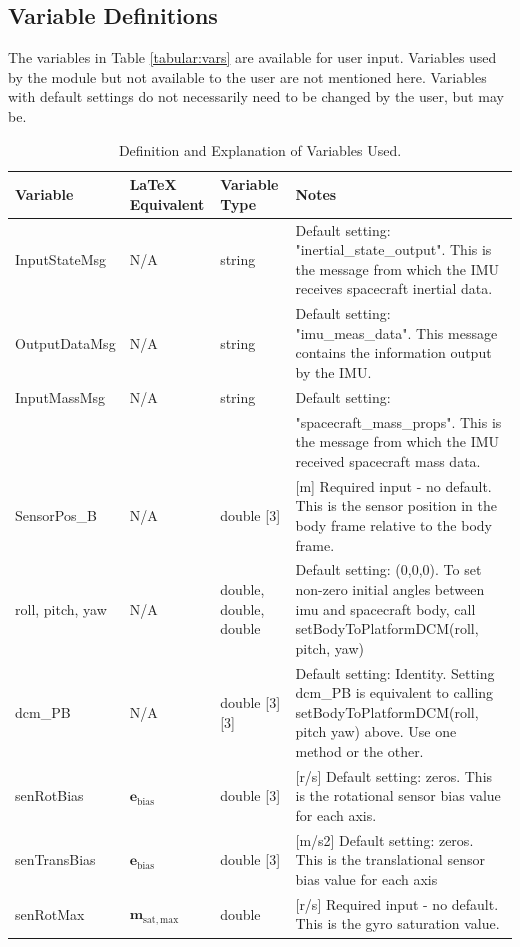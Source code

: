 \subsection{Variable Definitions}
The variables in Table \ref{tabular:vars} are available for user input. Variables used by the module but not available to the user are not mentioned here. Variables with default settings do not necessarily need to be changed by the user, but may be.
\begin{table}[H]
	\caption{Definition and Explanation of Variables Used.}
	\label{tab:errortol}
	\centering \fontsize{10}{10}\selectfont
	\begin{tabular}{ | m{3cm}| m{3cm} | m{3cm} | m{6cm} |} %
		\hline
		\textbf{Variable}   							& \textbf{LaTeX Equivalent} 	&		\textbf{Variable Type} & \textbf{Notes}			  \\ \hline
		InputStateMsg&N/A		   & string & Default setting: "inertial\_state\_output". This is the message from which the IMU receives spacecraft inertial data.\\ \hline
		OutputDataMsg & N/A & string & Default setting: "imu\_meas\_data". This message contains the information output by the IMU. \\ \hline
		InputMassMsg & N/A & string & Default setting: \\&&&"spacecraft\_mass\_props". This is the message from which the IMU received spacecraft mass data. \\ \hline
		SensorPos\_B & N/A & double [3] & [m] Required input - no default. This is the sensor position in the body frame relative to the body frame.\\ \hline
		roll, pitch, yaw & N/A  & double, double, double& Default setting: (0,0,0). To set non-zero initial angles between imu and spacecraft body, call setBodyToPlatformDCM(roll, pitch, yaw) \\ \hline
		dcm\_PB & N/A & double [3][3] & Default setting: Identity. Setting dcm\_PB is equivalent to calling setBodyToPlatformDCM(roll, pitch yaw) above. Use one method or the other. \\ \hline
		senRotBias & $\mathbf{e}_{\mathrm{bias}}$ & double [3] & [r/s] Default setting: zeros. This is the rotational sensor bias value for each axis. \\ \hline
		senTransBias & $\mathbf{e}_{\mathrm{bias}}$ & double [3] & [m/s2] Default setting: zeros. This is the translational sensor bias value for each axis \\ \hline
		senRotMax & $\mathbf{m}_{\mathrm{sat,max}}$& double & [r/s] Required input - no default. This is the gyro saturation value. \\ \hline

\end{tabular}
\end{table}
